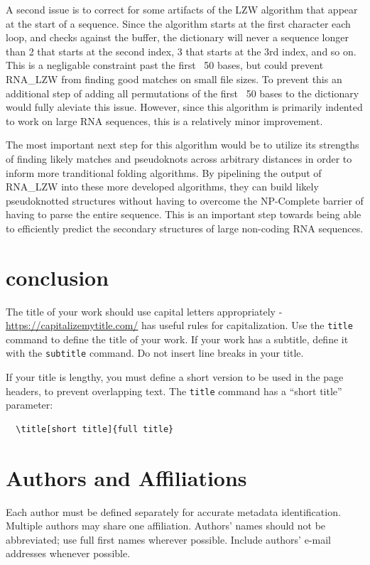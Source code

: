 \documentclass[sigconf]{acmart}
\begin{document}
A second issue is to correct for some artifacts of the LZW algorithm that appear at the start of a sequence. Since the algorithm starts at the first character each loop, and checks against the buffer, the dictionary will never a sequence longer than 2 that starts at the second index, 3 that starts at the 3rd index, and so on. This is a negligable constraint past the first ~50 bases, but could prevent RNA\_LZW from finding good matches on small file sizes. To prevent this an additional step of adding all permutations of the first ~50 bases to the dictionary would fully aleviate this issue. However, since this algorithm is primarily indented to work on large RNA sequences, this is a relatively minor improvement.

The most important next step for this algorithm would be to utilize its strengths of finding likely matches and pseudoknots across arbitrary distances in order to inform more tranditional folding algorithms. By pipelining the output of RNA\_LZW into these more developed algorithms, they can build likely pseudoknotted structures without having to overcome the NP-Complete barrier of having to parse the entire sequence. This is an important step towards being able to efficiently predict the secondary structures of large non-coding RNA sequences. 



\section{conclusion}

The title of your work should use capital letters appropriately -
\url{https://capitalizemytitle.com/} has useful rules for
capitalization. Use the {\verb|title|} command to define the title of
your work. If your work has a subtitle, define it with the
{\verb|subtitle|} command.  Do not insert line breaks in your title.

If your title is lengthy, you must define a short version to be used
in the page headers, to prevent overlapping text. The \verb|title|
command has a ``short title'' parameter:
\begin{verbatim}
  \title[short title]{full title}
\end{verbatim}

\section{Authors and Affiliations}

Each author must be defined separately for accurate metadata
identification. Multiple authors may share one affiliation. Authors'
names should not be abbreviated; use full first names wherever
possible. Include authors' e-mail addresses whenever possible.
\end{document}
